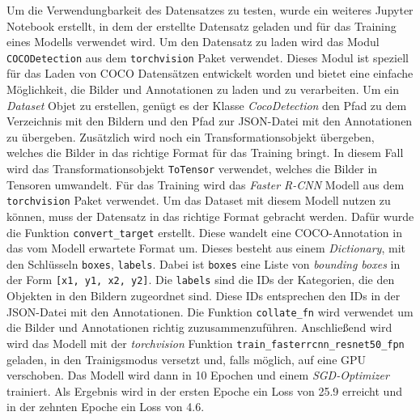 Um die Verwendungbarkeit des Datensatzes zu testen, wurde ein weiteres Jupyter Notebook erstellt, in dem der erstellte Datensatz geladen und für das Training eines Modells verwendet wird.
Um den Datensatz zu laden wird das Modul \texttt{COCODetection} aus dem \texttt{torchvision} Paket verwendet. Dieses Modul ist speziell für das Laden von COCO Datensätzen entwickelt worden und bietet eine einfache Möglichkeit, die Bilder und Annotationen zu laden und zu verarbeiten. 
Um ein \emph{Dataset} Objet zu erstellen, genügt es der Klasse \emph{CocoDetection} den Pfad zu dem Verzeichnis mit den Bildern und den Pfad zur JSON-Datei mit den Annotationen zu übergeben. Zusätzlich wird noch ein Transformationsobjekt übergeben, welches die Bilder in das richtige Format für das Training bringt. In diesem Fall wird das Transformationsobjekt \texttt{ToTensor} verwendet, welches die Bilder in Tensoren umwandelt.
Für das Training wird das \emph{Faster R-CNN} Modell aus dem \texttt{torchvision} Paket verwendet.
Um das Dataset mit diesem Modell nutzen zu können, muss der Datensatz in das richtige Format gebracht werden. Dafür wurde die Funktion \texttt{convert\_target} erstellt. Diese wandelt eine COCO-Annotation in das vom Modell erwartete Format um. Dieses besteht aus einem \emph{Dictionary}, mit den Schlüsseln \texttt{boxes}, \texttt{labels}. Dabei ist \texttt{boxes} eine Liste von \emph{bounding boxes} in der Form \texttt{[x1, y1, x2, y2]}. Die \texttt{labels} sind die IDs der Kategorien, die den Objekten in den Bildern zugeordnet sind. Diese IDs entsprechen den IDs in der JSON-Datei mit den Annotationen.
Die Funktion \texttt{collate\_fn} wird verwendet um die Bilder und Annotationen richtig zuzusammenzuführen.
Anschließend wird wird das Modell mit der \emph{torchvision} Funktion \texttt{train\_fasterrcnn\_resnet50\_fpn} geladen, in den Trainigsmodus versetzt und, falls möglich, auf eine GPU verschoben. Das Modell wird dann in 10 Epochen und einem \emph{SGD-Optimizer} trainiert.
Als Ergebnis wird in der ersten Epoche ein Loss von 25.9 erreicht und in der zehnten Epoche ein Loss von 4.6.

